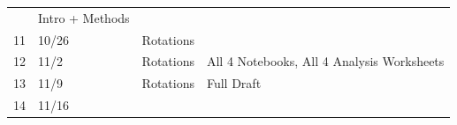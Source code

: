 \documentclass[]{tufte-book}
\begin{document}
\begin{longtable}[]{@{}llll@{}}
\begin{minipage}[t]{0.32\columnwidth}
\end{minipage} & \begin{minipage}[t]{0.40\columnwidth}\raggedright
Intro + Methods\strut
\end{minipage}\tabularnewline
\begin{minipage}[t]{0.04\columnwidth}\raggedright
11\strut
\end{minipage} & \begin{minipage}[t]{0.13\columnwidth}\raggedright
10/26\strut
\end{minipage} & \begin{minipage}[t]{0.32\columnwidth}\raggedright
Rotations\strut
\end{minipage} & \begin{minipage}[t]{0.40\columnwidth}\raggedright
\strut
\end{minipage}\tabularnewline
\begin{minipage}[t]{0.04\columnwidth}\raggedright
12\strut
\end{minipage} & \begin{minipage}[t]{0.13\columnwidth}\raggedright
11/2\strut
\end{minipage} & \begin{minipage}[t]{0.32\columnwidth}\raggedright
Rotations\strut
\end{minipage} & \begin{minipage}[t]{0.40\columnwidth}\raggedright
All 4 Notebooks, All 4 Analysis Worksheets\strut
\end{minipage}\tabularnewline
\begin{minipage}[t]{0.04\columnwidth}\raggedright
13\strut
\end{minipage} & \begin{minipage}[t]{0.13\columnwidth}\raggedright
11/9\strut
\end{minipage} & \begin{minipage}[t]{0.32\columnwidth}\raggedright
Rotations\strut
\end{minipage} & \begin{minipage}[t]{0.40\columnwidth}\raggedright
Full Draft\strut
\end{minipage}\tabularnewline
\begin{minipage}[t]{0.04\columnwidth}\raggedright
14\strut
\end{minipage} & \begin{minipage}[t]{0.13\columnwidth}\raggedright
11/16\strut
\end{minipage} & \begin{minipage}[t]{0.32\columnwidth}\raggedright

\end{minipage}
\end{longtable}
\end{document}
